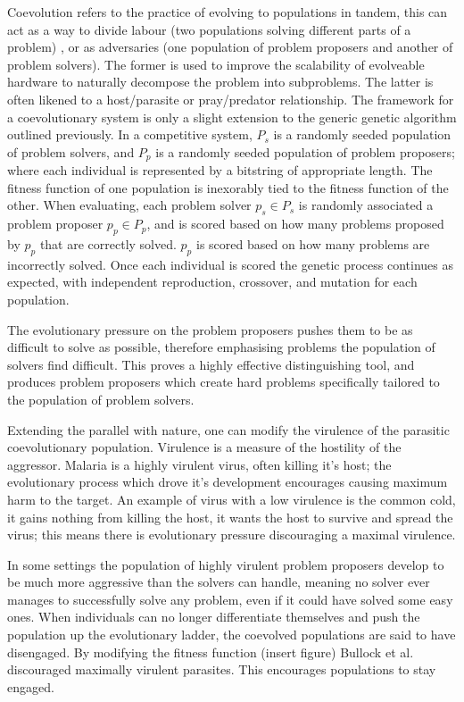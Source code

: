 Coevolution refers to the practice of evolving to populations in tandem, this can
act as a way to divide labour (two populations solving different parts of a problem)
 \cite{Potter:2000:CCA:1108888.1108890},
or as adversaries (one population of problem proposers and another of problem solvers).
The former is used to improve the scalability of evolveable hardware to naturally
decompose the problem into subproblems.
The latter is often likened to a host/parasite or pray/predator relationship.
The framework for a coevolutionary system is only a slight extension to the
generic genetic algorithm outlined previously. In a competitive system, $P_s$ is a randomly
seeded population of problem solvers, and $P_p$ is a randomly seeded population
of problem proposers; where each individual is represented by a bitstring of
appropriate length. The fitness function of one population is inexorably tied to
the fitness function of the other.
When evaluating, each problem solver $p_s \in P_s$ is randomly associated
a problem proposer $p_p \in P_p$, and is scored based on how many problems proposed by
$p_p$ that are correctly solved. $p_p$ is scored based on how many problems
are incorrectly solved. Once each individual is scored the genetic process continues as expected,
with independent reproduction, crossover, and mutation for each population.

The evolutionary pressure on the problem proposers pushes them to be as difficult
to solve as possible, therefore emphasising problems the population of solvers
find difficult. This proves a highly effective distinguishing tool, and produces
problem proposers which create hard problems specifically tailored to the population
of problem solvers.

Extending the parallel with nature, one can modify the virulence of the parasitic
coevolutionary population. Virulence is a measure of the hostility of the aggressor.
Malaria is a highly virulent virus, often killing it's host; the evolutionary
process which drove it's development encourages causing maximum harm to the target.
An example of virus with a low virulence is the common cold, it gains nothing from
killing the host, it wants the host to survive and spread the virus; this means
there is evolutionary pressure discouraging a maximal virulence.

In some settings the population of highly virulent problem proposers develop to be much more
aggressive than the solvers can handle, meaning no solver ever manages to
successfully solve any problem, even if it could have solved some easy ones.
When individuals can no longer
differentiate themselves and push the population up the evolutionary ladder,
the coevolved populations are said to have disengaged.
By modifying the fitness function (\todo insert figure) Bullock et al. \cite{6790490}
discouraged maximally
virulent parasites. This encourages populations to stay engaged.

